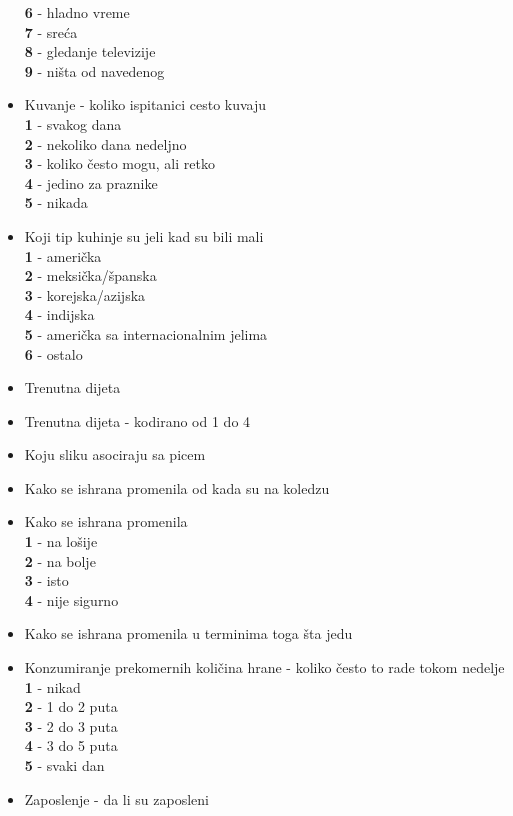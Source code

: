 \documentclass[12pt,a4paper]{article}
\begin{document}
\begin{itemize}
   \textbf{6} - hladno vreme \\
   \textbf{7} - sre\'  ca\\ 
   \textbf{8} - gledanje televizije\\
   \textbf{9} - ni\v sta od navedenog
   \item Kuvanje - koliko ispitanici cesto kuvaju\\
    \textbf{1} - svakog dana\\
    \textbf{2} - nekoliko dana nedeljno\\
    \textbf{3} - koliko \v cesto mogu, ali retko\\
    \textbf{4} - jedino za praznike\\
    \textbf{5} - nikada
  \item Koji tip kuhinje su jeli kad su bili mali\\
    \textbf{1} - ameri\v cka\\
    \textbf{2} - meksi\v cka/\v spanska\\
    \textbf{3} - korejska/azijska\\
    \textbf{4} - indijska\\
    \textbf{5} - ameri\v cka sa internacionalnim jelima\\
    \textbf{6} - ostalo
  \item Trenutna dijeta
  \item Trenutna dijeta - kodirano od 1 do 4
  \item Koju sliku asociraju sa picem
  \item Kako se ishrana promenila od kada su na koledzu
  \item Kako se ishrana promenila\\
    \textbf{1} - na lo\v sije\\
    \textbf{2} - na bolje\\
    \textbf{3} - isto\\
    \textbf{4} - nije sigurno
  \item Kako se ishrana promenila u terminima toga \v sta jedu
  \item Konzumiranje prekomernih koli\v cina hrane - koliko \v cesto to rade tokom nedelje\\
    \textbf{1} - nikad\\
    \textbf{2} - 1 do 2 puta\\
    \textbf{3} - 2 do 3 puta\\
    \textbf{4} - 3 do 5 puta\\
    \textbf{5} - svaki dan
  \item Zaposlenje - da li su zaposleni

\end{itemize}
\end{document}
